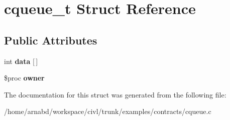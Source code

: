 \hypertarget{structcqueue__t}{}\section{cqueue\+\_\+t Struct Reference}
\label{structcqueue__t}
\subsection*{Public Attributes}
\begin{DoxyCompactItemize}
\item 
\hypertarget{structcqueue__t_ac60090b0b2731917ba256cf60c501c53}{}int {\bfseries data} \mbox{[}$\,$\mbox{]}\label{structcqueue__t_ac60090b0b2731917ba256cf60c501c53}

\item 
\hypertarget{structcqueue__t_ad30622c1afe5e9c1109f2789542b4dc2}{}\$proc {\bfseries owner}\label{structcqueue__t_ad30622c1afe5e9c1109f2789542b4dc2}

\end{DoxyCompactItemize}


The documentation for this struct was generated from the following file\+:\begin{DoxyCompactItemize}
\item 
/home/arnabd/workspace/civl/trunk/examples/contracts/cqueue.\+c\end{DoxyCompactItemize}
